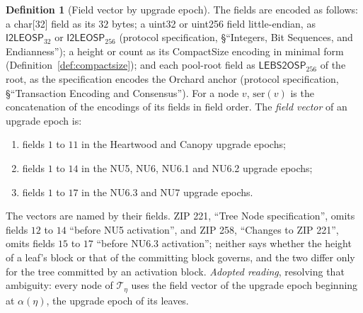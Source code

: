 \documentclass[11pt,a4paper]{article}
\theoremstyle{definition}
\newtheorem{definition}[theorem]{Definition}
\begin{document}
\begin{definition}[Field vector by upgrade epoch]\label{def:field-vector}
The fields are encoded as follows: a char[32] field as its $32$ bytes; a
uint32 or uint256 field little-endian, as $\mathsf{I2LEOSP}_{32}$ or
$\mathsf{I2LEOSP}_{256}$ (protocol specification, \S``Integers, Bit
Sequences, and Endianness''); a height or count as its CompactSize encoding
in minimal form (Definition~\ref{def:compactsize}); and each pool-root field
as $\mathsf{LEBS2OSP}_{256}$ of the root, as the specification encodes the
Orchard anchor (protocol specification, \S``Transaction Encoding and
Consensus''). For a node $v$, $\mathrm{ser}(v)$ is the concatenation of the
encodings of its fields in field order. The \emph{field vector} of an
upgrade epoch is:
\begin{enumerate}
\item fields $1$ to $11$ in the Heartwood and Canopy upgrade epochs;
\item fields $1$ to $14$ in the NU5, NU6, NU6.1 and NU6.2 upgrade epochs;
\item fields $1$ to $17$ in the NU6.3 and NU7 upgrade epochs.
\end{enumerate}
The vectors are named by their fields. ZIP 221, ``Tree Node
specification'', omits fields $12$ to $14$ ``before NU5 activation'', and
ZIP 258, ``Changes to ZIP 221'', omits fields $15$ to $17$ ``before NU6.3
activation''; neither says whether the height of a leaf's block or that of
the committing block governs, and the two differ only for the tree committed
by an activation block. \emph{Adopted reading}, resolving that ambiguity:
every node of $\mathcal{T}_\eta$ uses the field vector of the upgrade epoch
beginning at $\alpha(\eta)$, the upgrade epoch of its leaves.
\end{definition}
\end{document}
